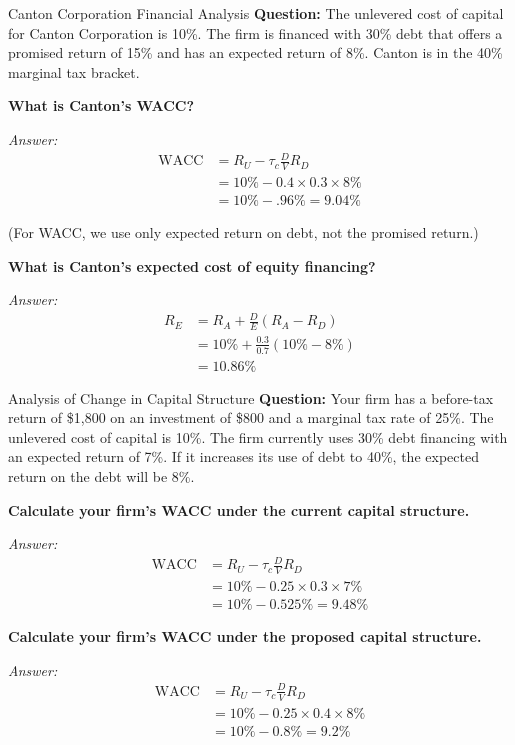 \begin{examplebox}{Canton Corporation Financial Analysis}
    \textbf{Question:} The unlevered cost of capital for Canton Corporation is 10\%. The firm is financed with 30\% debt that offers a promised return of 15\% and has an expected return of 8\%. Canton is in the 40\% marginal tax bracket.
    
    \textbf{What is Canton's WACC?}
    
    \textit{Answer:}
    \begin{align*}
   \text{WACC} &= R_U - \tau_c \frac{D}{V} R_D \\
               &= 10\% - 0.4 \times 0.3 \times 8\% \\
               &= 10\% - .96\% = 9.04\%
    \end{align*}

    (For WACC, we use only expected return on debt, not the promised return.)
    
    \textbf{What is Canton’s expected cost of equity financing?}
    
    \textit{Answer:} 
    \begin{align*}
        R_E &= R_A + \frac{D}{E} (R_A - R_D) \\
            &= 10\% + \frac{0.3}{0.7} (10\% - 8\%) \\
            &= 10.86\%
    \end{align*}
\end{examplebox}


\begin{examplebox}{Analysis of Change in Capital Structure}
    \textbf{Question:} Your firm has a before-tax return of \$1,800 on an investment of \$800 and a marginal tax rate of 25\%. The unlevered cost of capital is 10\%. The firm currently uses 30\% debt financing with an expected return of 7\%. If it increases its use of debt to 40\%, the expected return on the debt will be 8\%.
    
    \textbf{Calculate your firm's WACC under the current capital structure.}
    
    \textit{Answer:}
    \begin{align*}
    \text{WACC} &= R_U - \tau_c \frac{D}{V} R_D \\
               &= 10\% - 0.25 \times 0.3 \times 7\% \\
               &= 10\% - 0.525\% = 9.48\%
    \end{align*}
    
    \textbf{Calculate your firm's WACC under the proposed capital structure.}
    
    \textit{Answer:}
    \begin{align*}
    \text{WACC} &= R_U - \tau_c \frac{D}{V} R_D \\
               &= 10\% - 0.25 \times 0.4 \times 8\% \\
               &= 10\% - 0.8\% = 9.2\%
    \end{align*}
\end{examplebox}
    







